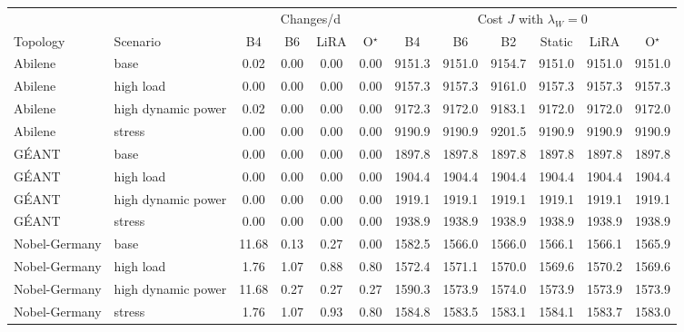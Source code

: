 \begin{tabular}{@{}llcccccccccc@{}}
\toprule
 & & \multicolumn{4}{c}{Changes/d} & \multicolumn{6}{c}{Cost $J$ with $\lambda_W=0$} \\
\cmidrule(lr){3-6}\cmidrule(lr){7-12}
Topology & Scenario & B4 & B6 & LiRA & O$^\star$ & B4 & B6 & B2 & Static & LiRA & O$^\star$ \\
\midrule
Abilene & base & 0.02 & 0.00 & 0.00 & 0.00 & 9151.3 & 9151.0 & 9154.7 & 9151.0 & 9151.0 & 9151.0 \\
Abilene & high load & 0.00 & 0.00 & 0.00 & 0.00 & 9157.3 & 9157.3 & 9161.0 & 9157.3 & 9157.3 & 9157.3 \\
Abilene & high dynamic power & 0.02 & 0.00 & 0.00 & 0.00 & 9172.3 & 9172.0 & 9183.1 & 9172.0 & 9172.0 & 9172.0 \\
Abilene & stress & 0.00 & 0.00 & 0.00 & 0.00 & 9190.9 & 9190.9 & 9201.5 & 9190.9 & 9190.9 & 9190.9 \\
G\'{E}ANT & base & 0.00 & 0.00 & 0.00 & 0.00 & 1897.8 & 1897.8 & 1897.8 & 1897.8 & 1897.8 & 1897.8 \\
G\'{E}ANT & high load & 0.00 & 0.00 & 0.00 & 0.00 & 1904.4 & 1904.4 & 1904.4 & 1904.4 & 1904.4 & 1904.4 \\
G\'{E}ANT & high dynamic power & 0.00 & 0.00 & 0.00 & 0.00 & 1919.1 & 1919.1 & 1919.1 & 1919.1 & 1919.1 & 1919.1 \\
G\'{E}ANT & stress & 0.00 & 0.00 & 0.00 & 0.00 & 1938.9 & 1938.9 & 1938.9 & 1938.9 & 1938.9 & 1938.9 \\
Nobel-Germany & base & 11.68 & 0.13 & 0.27 & 0.00 & 1582.5 & 1566.0 & 1566.0 & 1566.1 & 1566.1 & 1565.9 \\
Nobel-Germany & high load & 1.76 & 1.07 & 0.88 & 0.80 & 1572.4 & 1571.1 & 1570.0 & 1569.6 & 1570.2 & 1569.6 \\
Nobel-Germany & high dynamic power & 11.68 & 0.27 & 0.27 & 0.27 & 1590.3 & 1573.9 & 1574.0 & 1573.9 & 1573.9 & 1573.9 \\
Nobel-Germany & stress & 1.76 & 1.07 & 0.93 & 0.80 & 1584.8 & 1583.5 & 1583.1 & 1584.1 & 1583.7 & 1583.0 \\
\bottomrule
\end{tabular}
